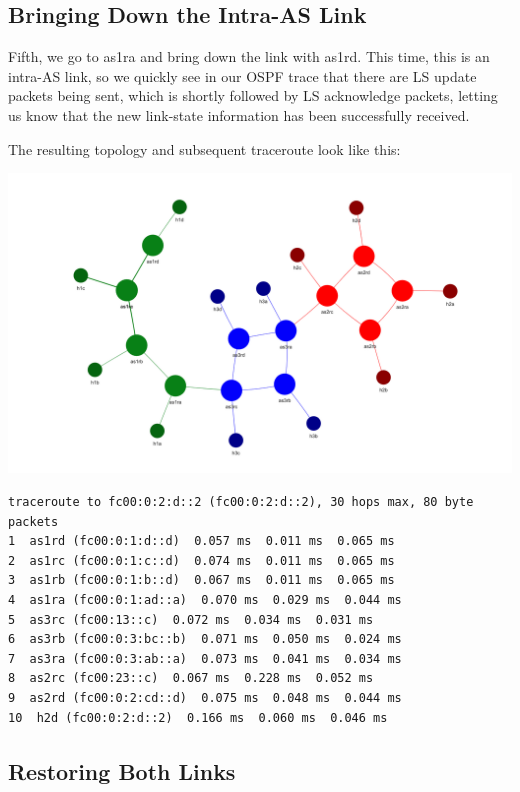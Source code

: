 \subsection{Bringing Down the Intra-AS Link}

Fifth, we go to as1ra and bring down the link with as1rd. This time, this is an intra-AS link, so we quickly see in our OSPF trace that there are LS update packets being sent, which is shortly followed by LS acknowledge packets, letting us know that the new link-state information has been successfully received.

The resulting topology and subsequent traceroute look like this:

\begin{center}
\includegraphics[scale=0.6]{Lab4/graphics/ex5graph3.png}
\end{center}

\begin{verbatim}
traceroute to fc00:0:2:d::2 (fc00:0:2:d::2), 30 hops max, 80 byte packets
1  as1rd (fc00:0:1:d::d)  0.057 ms  0.011 ms  0.065 ms
2  as1rc (fc00:0:1:c::d)  0.074 ms  0.011 ms  0.065 ms
3  as1rb (fc00:0:1:b::d)  0.067 ms  0.011 ms  0.065 ms
4  as1ra (fc00:0:1:ad::a)  0.070 ms  0.029 ms  0.044 ms
5  as3rc (fc00:13::c)  0.072 ms  0.034 ms  0.031 ms
6  as3rb (fc00:0:3:bc::b)  0.071 ms  0.050 ms  0.024 ms
7  as3ra (fc00:0:3:ab::a)  0.073 ms  0.041 ms  0.034 ms
8  as2rc (fc00:23::c)  0.067 ms  0.228 ms  0.052 ms
9  as2rd (fc00:0:2:cd::d)  0.075 ms  0.048 ms  0.044 ms
10  h2d (fc00:0:2:d::2)  0.166 ms  0.060 ms  0.046 ms
\end{verbatim}


\subsection{Restoring Both Links}

